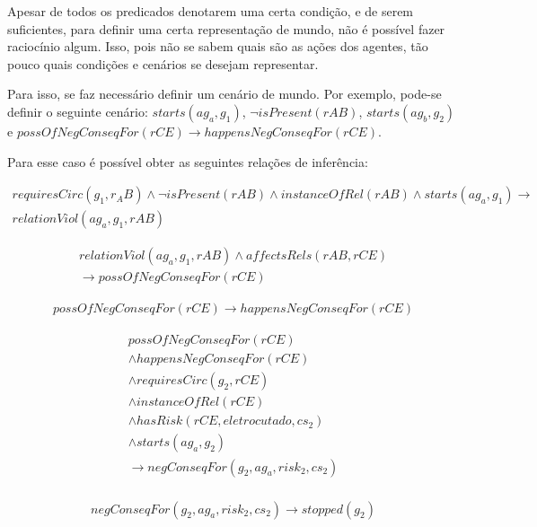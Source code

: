 Apesar de todos os predicados denotarem uma certa condição, e de serem suficientes, para definir uma certa representação de mundo, não é possível fazer raciocínio algum. Isso, pois não se sabem quais são as ações dos agentes, tão pouco quais condições e cenários se desejam representar.  

Para isso, se faz necessário definir um cenário de mundo. Por exemplo, pode-se definir o seguinte cenário: $starts(ag_a,g_1)$, $\neg isPresent(rAB)$, $starts(ag_b,g_2)$ e $ possOfNegConseqFor(rCE) \to happensNegConseqFor(rCE)$. 

Para esse caso é possível obter as seguintes relações de inferência: 

\begin{eqnarray}
    requiresCirc(g_1,r_AB)\wedge 
    \neg isPresent(rAB) \wedge 
    instanceOfRel(rAB) \wedge 
    starts(ag_a,g_1) \to \nonumber \\
    relationViol(ag_a,g_1,rAB) 
\end{eqnarray}

\begin{eqnarray}
    relationViol(ag_a,g_1,rAB)  \wedge 
    affectsRels(rAB,rCE) \nonumber \\
    \to possOfNegConseqFor(rCE)  
\end{eqnarray}

\begin{eqnarray}
    possOfNegConseqFor(rCE) \to happensNegConseqFor(rCE) 
\end{eqnarray}

\begin{eqnarray}\label{paybutiamnotguilty}
   possOfNegConseqFor(rCE) \nonumber \\
   \wedge happensNegConseqFor(rCE) \nonumber \\ 
   \wedge requiresCirc(g_2,rCE) \nonumber \\  
   \wedge instanceOfRel(rCE) \nonumber \\ 
   \wedge hasRisk(rCE,eletrocutado,cs_2) \nonumber \\  
   \wedge starts(ag_a,g_2) \nonumber \\ 
   \to negConseqFor(g_2,ag_a,risk_2,cs_2) \\ \nonumber
\end{eqnarray}


\begin{eqnarray}\label{badcons}
    negConseqFor(g_2,ag_a,risk_2,cs_2) \to stopped(g_2) 
\end{eqnarray}


